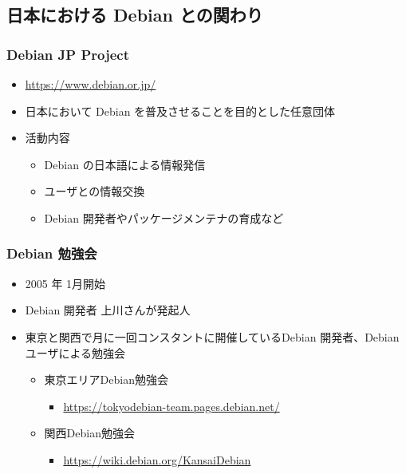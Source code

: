 \documentclass[mingoth,a4paper]{jsarticle}
\begin{document}

\subsection{日本における Debian との関わり}


\subsubsection{Debian JP Project}
  
\begin{itemize}
\item \url{https://www.debian.or.jp/}
\item 日本において Debian を普及させることを目的とした任意団体
\item 活動内容
  \begin{itemize}
  \item Debian の日本語による情報発信
  \item ユーザとの情報交換
  \item Debian 開発者やパッケージメンテナの育成など
  \end{itemize}
\end{itemize}


\subsubsection{Debian 勉強会}


\begin{itemize}
\item 2005 年 1月開始
\item Debian 開発者 上川さんが発起人
\item 東京と関西で月に一回コンスタントに開催しているDebian 開発者、Debian ユーザによる勉強会
  \begin{itemize}
  \item 東京エリアDebian勉強会
    \begin{itemize}
    \item \url{https://tokyodebian-team.pages.debian.net/}
    \end{itemize}
  \item 関西Debian勉強会
    \begin{itemize}
    \item \url{https://wiki.debian.org/KansaiDebian}
    \end{itemize}
  \end{itemize}
\end{itemize}
\end{document}
